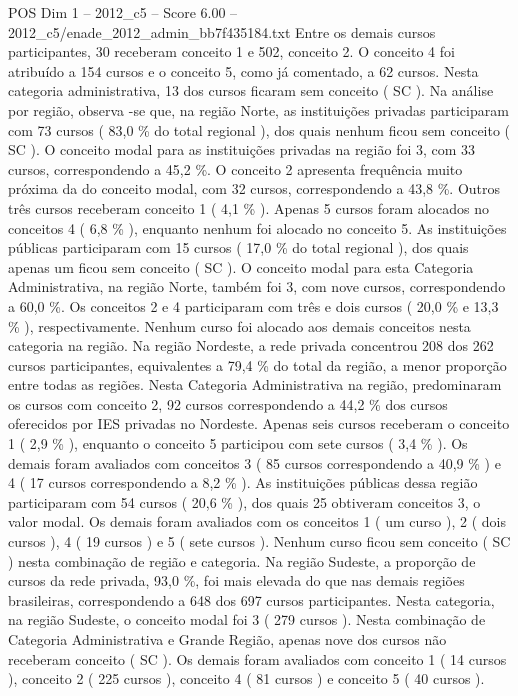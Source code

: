 \begin{textsample}{POS Dim 1 – 2012\_c5 – Score 6.00 – 2012\_c5/enade\_2012\_admin\_bb7f435184.txt}
Entre os demais cursos participantes, 30 receberam conceito 1 e 502, conceito 2.
O conceito 4 foi atribuído a 154 cursos e o conceito 5, como já comentado, a 62 cursos.
Nesta categoria administrativa, 13 dos cursos ficaram sem conceito ( SC ).
Na análise por região, observa -se que, na região Norte, as instituições privadas participaram com 73 cursos ( 83,0 \% do total regional ), dos quais nenhum ficou sem conceito ( SC ).
O conceito modal para as instituições privadas na região foi 3, com 33 cursos, correspondendo a 45,2 \%.
O conceito 2 apresenta frequência muito próxima da do conceito modal, com 32 cursos, correspondendo a 43,8 \%.
Outros três cursos receberam conceito 1 ( 4,1 \% ).
Apenas 5 cursos foram alocados no conceitos 4 ( 6,8 \% ), enquanto nenhum foi alocado no conceito 5.
As instituições públicas participaram com 15 cursos ( 17,0 \% do total regional ), dos quais apenas um ficou sem conceito ( SC ).
O conceito modal para esta Categoria Administrativa, na região Norte, também foi 3, com nove cursos, correspondendo a 60,0 \%.
Os conceitos 2 e 4 participaram com três e dois cursos ( 20,0 \% e 13,3 \% ), respectivamente.
Nenhum curso foi alocado aos demais conceitos nesta categoria na região.
Na região Nordeste, a rede privada concentrou 208 dos 262 cursos participantes, equivalentes a 79,4 \% do total da região, a menor proporção entre todas as regiões.
Nesta Categoria Administrativa na região, predominaram os cursos com conceito 2, 92 cursos correspondendo a 44,2 \% dos cursos oferecidos por IES privadas no Nordeste.
Apenas seis cursos receberam o conceito 1 ( 2,9 \% ), enquanto o conceito 5 participou com sete cursos ( 3,4 \% ).
Os demais foram avaliados com conceitos 3 ( 85 cursos correspondendo a 40,9 \% ) e 4 ( 17 cursos correspondendo a 8,2 \% ).
As instituições públicas dessa região participaram com 54 cursos ( 20,6 \% ), dos quais 25 obtiveram conceitos 3, o valor modal.
Os demais foram avaliados com os conceitos 1 ( um curso ), 2 ( dois cursos ), 4 ( 19 cursos ) e 5 ( sete cursos ).
Nenhum curso ficou sem conceito ( SC ) nesta combinação de região e categoria.
Na região Sudeste, a proporção de cursos da rede privada, 93,0 \%, foi mais elevada do que nas demais regiões brasileiras, correspondendo a 648 dos 697 cursos participantes.
Nesta categoria, na região Sudeste, o conceito modal foi 3 ( 279 cursos ).
Nesta combinação de Categoria Administrativa e Grande Região, apenas nove dos cursos não receberam conceito ( SC ).
Os demais foram avaliados com conceito 1 ( 14 cursos ), conceito 2 ( 225 cursos ), conceito 4 ( 81 cursos ) e conceito 5 ( 40 cursos ).

\end{textsample}
